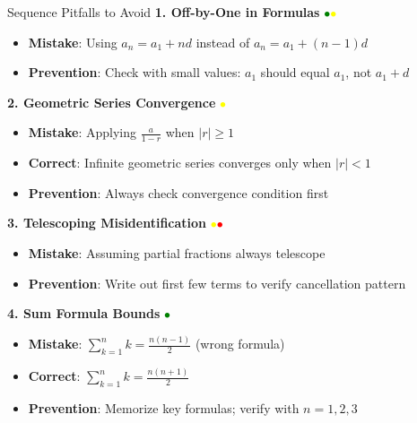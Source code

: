 \documentclass{article}
\begin{document}
\begin{trapbox}{Sequence Pitfalls to Avoid}
\textbf{1. Off-by-One in Formulas} \textcolor{green}{$\bullet$}\textcolor{yellow}{$\bullet$}
\begin{itemize}[nosep]
\item \textbf{Mistake}: Using $a_n = a_1 + nd$ instead of $a_n = a_1 + (n-1)d$
\item \textbf{Prevention}: Check with small values: $a_1$ should equal $a_1$, not $a_1 + d$
\end{itemize}

\textbf{2. Geometric Series Convergence} \textcolor{yellow}{$\bullet$}
\begin{itemize}[nosep]
\item \textbf{Mistake}: Applying $\frac{a}{1-r}$ when $|r| \geq 1$
\item \textbf{Correct}: Infinite geometric series converges only when $|r| < 1$
\item \textbf{Prevention}: Always check convergence condition first
\end{itemize}

\textbf{3. Telescoping Misidentification} \textcolor{yellow}{$\bullet$}\textcolor{red}{$\bullet$}
\begin{itemize}[nosep]
\item \textbf{Mistake}: Assuming partial fractions always telescope
\item \textbf{Prevention}: Write out first few terms to verify cancellation pattern
\end{itemize}

\textbf{4. Sum Formula Bounds} \textcolor{green}{$\bullet$}
\begin{itemize}[nosep]
\item \textbf{Mistake}: $\sum_{k=1}^{n} k = \frac{n(n-1)}{2}$ (wrong formula)
\item \textbf{Correct}: $\sum_{k=1}^{n} k = \frac{n(n+1)}{2}$
\item \textbf{Prevention}: Memorize key formulas; verify with $n=1,2,3$
\end{itemize}


\end{trapbox}
\end{document}

